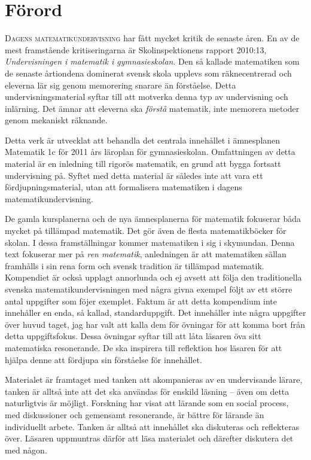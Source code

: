 \chapter*{Förord}
\lettrine{D}{agens matematikundervisning} har fått mycket kritik de senaste
åren.
En av de mest framstående kritiseringarna är Skolinspektionens rapport 2010:13,
\emph{Undervisningen i matematik i gymnasieskolan}.
Den så kallade matematiken som de senaste årtiondena dominerat svensk skola
upplevs som räknecentrerad och eleverna lär sig genom memorering snarare än
förståelse.
Detta undervisningsmaterial syftar till att motverka denna typ av undervisning 
och inlärning.
Det ämnar att eleverna ska \emph{förstå} matematik, inte memorera metoder genom
mekaniskt räknande.

Detta verk är utvecklat att behandla det centrala innehållet i ämnesplanen 
Matematik 1c för 2011 års läroplan för gymnasieskolan.
Omfattningen av detta material är en inledning till rigorös matematik, en grund
att bygga fortsatt undervisning på.
Syftet med detta material är således inte att vara ett fördjupningsmaterial,
utan att formalisera matematiken i dagens matematikundervisning.

De gamla kursplanerna och de nya ämnesplanerna för matematik fokuserar båda
mycket på tillämpad matematik.
Det gör även de flesta matematikböcker för skolan.
I dessa framställningar kommer matematiken i sig i skymundan.
Denna text fokuserar mer på \emph{ren matematik}, anledningen är att
matematiken sällan framhålls i sin rena form och svensk tradition är tillämpad
matematik.
Kompendiet är också upplagt annorlunda och ej avsett att följa den
traditionella svenska matematikundervisningen med några givna exempel följt av
ett större antal uppgifter som föjer exemplet.
Faktum är att detta kompendium inte innehåller en enda, så kallad,
standarduppgift.
Det innehåller inte några uppgifter över huvud taget, jag har valt att kalla
dem för övningar för att komma bort från detta uppgiftsfokus.
Dessa övningar syftar till att låta läsaren öva sitt matematiska resonerande.
De ska inspirera till reflektion hos läsaren för att hjälpa denne att fördjupa 
sin förståelse för innehållet.

Materialet är framtaget med tanken att akompanieras av en undervisande lärare,
tanken är alltså inte att det ska användas för enskild läsning -- även om detta
naturligtvis är möjligt.
Forskning har visat att lärande som en social process, med diskussioner och
gemensamt resonerande, är bättre för lärande än individuellt arbete.
Tanken är alltså att innehållet ska diskuteras och reflekteras över.
Läsaren uppmuntras därför att läsa materialet och därefter diskutera det med 
någon.

